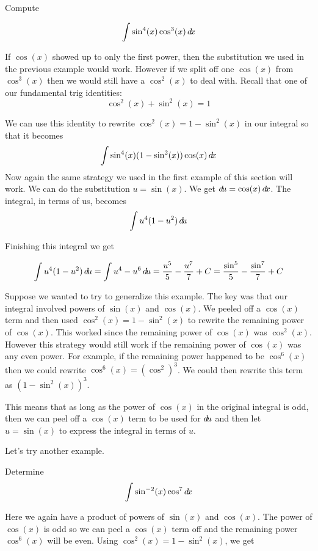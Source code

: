 \documentclass{ximera}
\begin{document}
\begin{example}
Compute

\[ 
\int \sin^{4}(x) \cos^{3}(x) \mathop{}\!d\! x 
\]

\begin{explanation}
 If $\cos(x)$ showed up to only the first power, then the substitution we used in the previous example would work. However if we split off one  $\cos(x)$ from $\cos^{3}(x)$ then we would still have a $\cos^{2}(x)$ to deal with. Recall that one of our fundamental trig identities:
\[
\cos^{2}(x) + \sin^{2}(x)=1
\]

We can use this identity to rewrite $\cos^{2}(x)=1-\sin^{2}(x)$ in our integral so that it becomes
\[
\int \sin^{4}(x) (1-\sin^{2}(x)) \cos(x) \mathop{}\!d\! x
\]
Now again the same strategy we used in the first example of this section will work. We can do the substitution $u=\sin(x)$. We get $\mathop{}\!d\! u= \cos(x) \mathop{}\!d\! x$. 
The integral, in terms of us, becomes
\[ 
\int u^{4}(1-u^{2}) \mathop{}\!d\! u
\]

Finishing this integral we get 

\[ 
\int u^{4}(1-u^{2}) \mathop{}\!d\! u= \int u^{4}-u^{6} \mathop{}\!d\! u = \frac{u^{5}}{5} - \frac{u^{7}}{7} + C =\frac{ \sin^{5}}{5} - \frac{ \sin^{7}}{7} + C
\]

\end{explanation}
\end{example}

Suppose we wanted to try to generalize this example. The key was that our integral involved powers of $\sin(x)$ and $\cos(x)$. We peeled off a $\cos(x)$ term and then used $\cos^{2}(x)=1-\sin^{2}(x)$ to rewrite the remaining power of $\cos(x)$. This worked since the remaining power of $\cos(x)$ was $\cos^{2}(x)$. However this strategy would still work if the remaining power of $\cos(x)$ was any even power. For example, if the remaining power happened to be $\cos^{6}(x)$ then we could rewrite $\cos^{6}(x)=(\cos^{2})^{3}$. We could then rewrite this term as $(1-\sin^{2}(x))^{3}$. 

This means that as long as the power of $\cos(x)$ in the original integral is odd, then we can peel off a $\cos(x)$ term to be used for $\mathop{}\!d\! u$ and then let $u=\sin(x)$ to express the integral in terms of $u$. 

Let's try another example.

\begin{example}
Determine 
\[
\int \sin^{-2}(x)\cos^{7} \mathop{}\!d\! x
\]
\begin{explanation}
Here we again have a product of powers of $\sin(x)$ and $\cos(x)$. The power of $\cos(x)$ is odd so we can peel a $\cos(x)$ term off and the remaining power $\cos^{6}(x)$ will be even. Using $\cos^{2}(x)=1-\sin^{2}(x)$, we get

\[

\]
\end{explanation}

\end{example}
\end{document}
